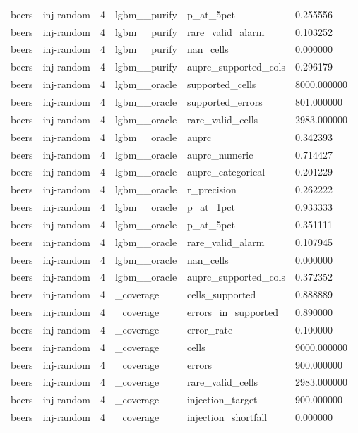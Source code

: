 \begin{tabular}{llllll}
beers & inj-random & 4 & lgbm\_\_purify & p\_at\_5pct & 0.255556 \\
beers & inj-random & 4 & lgbm\_\_purify & rare\_valid\_alarm & 0.103252 \\
beers & inj-random & 4 & lgbm\_\_purify & nan\_cells & 0.000000 \\
beers & inj-random & 4 & lgbm\_\_purify & auprc\_supported\_cols & 0.296179 \\
beers & inj-random & 4 & lgbm\_\_oracle & supported\_cells & 8000.000000 \\
beers & inj-random & 4 & lgbm\_\_oracle & supported\_errors & 801.000000 \\
beers & inj-random & 4 & lgbm\_\_oracle & rare\_valid\_cells & 2983.000000 \\
beers & inj-random & 4 & lgbm\_\_oracle & auprc & 0.342393 \\
beers & inj-random & 4 & lgbm\_\_oracle & auprc\_numeric & 0.714427 \\
beers & inj-random & 4 & lgbm\_\_oracle & auprc\_categorical & 0.201229 \\
beers & inj-random & 4 & lgbm\_\_oracle & r\_precision & 0.262222 \\
beers & inj-random & 4 & lgbm\_\_oracle & p\_at\_1pct & 0.933333 \\
beers & inj-random & 4 & lgbm\_\_oracle & p\_at\_5pct & 0.351111 \\
beers & inj-random & 4 & lgbm\_\_oracle & rare\_valid\_alarm & 0.107945 \\
beers & inj-random & 4 & lgbm\_\_oracle & nan\_cells & 0.000000 \\
beers & inj-random & 4 & lgbm\_\_oracle & auprc\_supported\_cols & 0.372352 \\
beers & inj-random & 4 & \_coverage & cells\_supported & 0.888889 \\
beers & inj-random & 4 & \_coverage & errors\_in\_supported & 0.890000 \\
beers & inj-random & 4 & \_coverage & error\_rate & 0.100000 \\
beers & inj-random & 4 & \_coverage & cells & 9000.000000 \\
beers & inj-random & 4 & \_coverage & errors & 900.000000 \\
beers & inj-random & 4 & \_coverage & rare\_valid\_cells & 2983.000000 \\
beers & inj-random & 4 & \_coverage & injection\_target & 900.000000 \\
beers & inj-random & 4 & \_coverage & injection\_shortfall & 0.000000 \\

\end{tabular}
